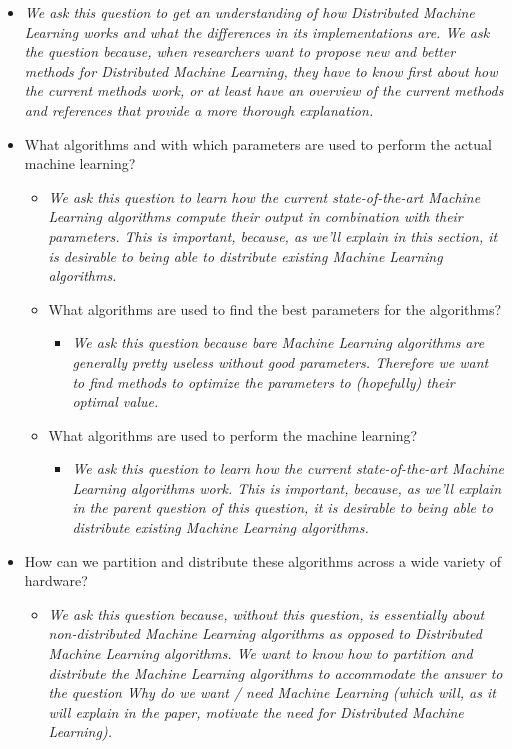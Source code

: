 \begin{itemize}
	\begin{itemize}
		\item \textit{We ask this question to get an understanding of how Distributed Machine Learning works and what the differences in its implementations are. We ask the question because, when researchers want to propose new and better methods for Distributed Machine Learning, they have to know first about how the current methods work, or at least have an overview of the current methods and references that provide a more thorough explanation.}
		\item What algorithms and with which parameters are used to perform the actual machine learning?
		\begin{itemize}
			\item \textit{We ask this question to learn how the current state-of-the-art Machine Learning algorithms compute their output in combination with their parameters. This is important, because, as we’ll explain in this section, it is desirable to being able to distribute existing Machine Learning algorithms.}
			\item What algorithms are used to find the best parameters for the algorithms?
			\begin{itemize}
				\item \textit{We ask this question because bare Machine Learning algorithms are generally pretty useless without good parameters. Therefore we want to find methods to optimize the parameters to (hopefully) their optimal value.}
			\end{itemize}
			\item What algorithms are used to perform the machine learning?
			\begin{itemize}
				\item \textit{We ask this question to learn how the current state-of-the-art Machine Learning algorithms work. This is important, because, as we’ll explain in the parent question of this question, it is desirable to being able to distribute existing Machine Learning algorithms.}
			\end{itemize}
		\end{itemize}
		\item How can we partition and distribute these algorithms across a wide variety of hardware?
		\begin{itemize}
			\item \textit{We ask this question because, without this question, is essentially about non-distributed Machine Learning algorithms as opposed to Distributed Machine Learning algorithms. We want to know how to partition and distribute the Machine Learning algorithms to accommodate the answer to the question Why do we want / need Machine Learning (which will, as it will explain in the paper, motivate the need for Distributed Machine Learning).}

\end{itemize}
\end{itemize}
\end{itemize}
